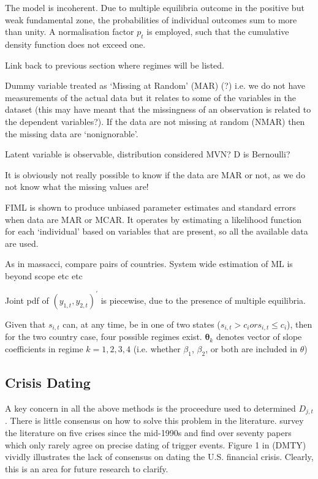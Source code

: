 \documentclass[../base.tex]{subfiles}
\begin{document}

The model is incoherent. Due to multiple equilibria outcome in the positive but weak fundamental zone, the probabilities of individual outcomes sum to more than unity. A normalisation factor $p_t$ is employed, such that the cumulative density function does not exceed one. 

Link back to previous section where regimes will be listed.
 

Dummy variable treated as `Missing at Random' (MAR) (?) i.e. we do not have measurements of the actual data but it relates to some of the variables in the dataset (this may have meant that the missingness of an observation is related to the dependent variables?). If the data are not missing at random (NMAR) then the missing data are `nonignorable'. 

Latent variable is observable, distribution considered MVN? D is Bernoulli?

It is obviously not really possible to know if the data are MAR or not, as we do not know what the missing values are! 

FIML is shown to produce unbiased parameter estimates and standard errors when data are MAR or MCAR. It operates by estimating a likelihood function for each `individual' based on variables that are present, so all the available data are used. 

As in massacci, compare pairs of countries. System wide estimation of ML is beyond scope etc etc

 Joint pdf of $(y_{1,t}, y_{2,t})^{\prime}$ is piecewise, due to the presence of multiple equilibria.


Given that $s_{i,t}$ can, at any time, be in one of two states ($s_{i,t} > c_i or s_{i,t} \leq c_i$), then for the two country case, four possible regimes exist. $\boldsymbol{\theta}_k$ denotes vector of slope coefficients in regime $k = 1, 2, 3, 4$ (i.e. whether $\beta_1$, $\beta_2$, or both are included in $\theta$)


\subsection{Crisis Dating}
\label{dating_methodology}

A key concern in all the above methods is the proceedure used to determined $D_{j,t}$. There is little consensus on how to solve this problem in the literature. \cite{fry2011actually} survey the literature on five crises since the mid-1990s and find over seventy papers which only rarely agree on precise dating of trigger events. Figure 1 in  \cite{dungey2015endogenous} (DMTY) vividly illustrates the lack of consensus on dating the U.S. financial crisis. Clearly, this is an area for future research to clarify.
\end{document}
